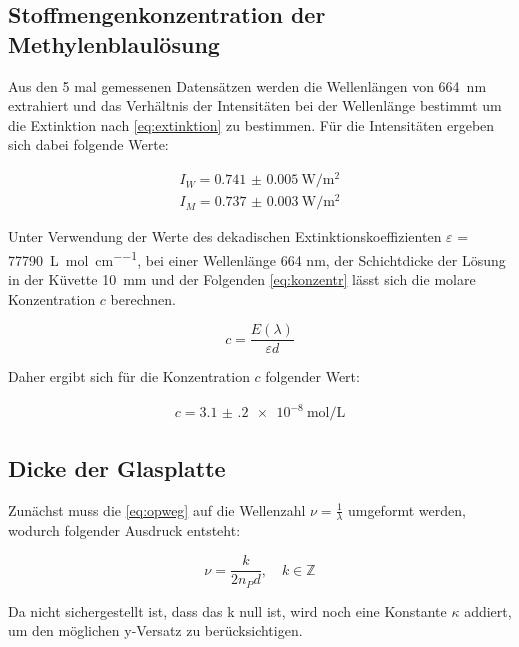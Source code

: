 \documentclass[11pt,ngerman]{scrartcl}
\begin{document}
\newpage

\subsection{Stoffmengenkonzentration der Methylenblaulösung}

Aus den 5 mal gemessenen Datensätzen werden die Wellenlängen von \SI{664}{\nm} extrahiert und das Verhältnis der Intensitäten bei der Wellenlänge bestimmt um die Extinktion nach \autoref{eq:extinktion} zu bestimmen. Für die Intensitäten ergeben sich dabei folgende Werte:

\begin{align*}
	I_W = \SI{0.741(5)}{\watt\per\meter\squared} \\
	I_M = \SI{0.737(3)}{\watt\per\meter\squared}
\end{align*}

\noindent Unter Verwendung der Werte des dekadischen Extinktionskoeffizienten
$\varepsilon$ = \SI{77790}{\liter\per\mol\per\cm}, bei einer Wellenlänge 664
nm, der Schichtdicke der Lösung in der Küvette \SI{10}{\mm} und der Folgenden
\autoref{eq:konzentr} lässt sich die molare Konzentration $c$ berechnen.

\begin{equation}
	c = \frac{E(\lambda)}{\varepsilon d}
	\label{eq:konzentr}
\end{equation}

\noindent Daher ergibt sich für die Konzentration $c$ folgender Wert:

\begin{align*}
	c =  \SI{3.1(2)e-8}{\mol\per\liter}
\end{align*}




\subsection{Dicke der Glasplatte}



\noindent Zunächst muss die \autoref{eq:opweg} auf die Wellenzahl $\nu = \frac{1}{\lambda} $ umgeformt werden, wodurch folgender Ausdruck entsteht:

\begin{equation}
	\nu = \frac{k}{2n_P d} , \quad k\in \mathbb{Z}
	\label{eq:wellenz}
\end{equation}

\noindent Da nicht sichergestellt ist, dass das k null ist, wird noch eine Konstante $\kappa$ addiert, um den möglichen y-Versatz zu berücksichtigen.
\end{document}
